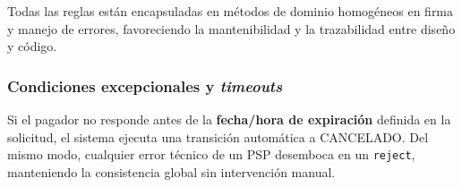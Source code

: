 Todas las reglas están encapsuladas en métodos de dominio homogéneos en firma y manejo de errores, favoreciendo la mantenibilidad y la trazabilidad entre diseño y código.

\subsubsection{Condiciones excepcionales y \emph{timeouts}}

Si el pagador no responde antes de la \textbf{fecha/hora de expiración} definida en la solicitud, el sistema ejecuta una transición automática a \textsc{CANCELADO}. Del mismo modo, cualquier error técnico de un PSP desemboca en un \texttt{reject}, manteniendo la consistencia global sin intervención manual.
%
%
%
%
%
